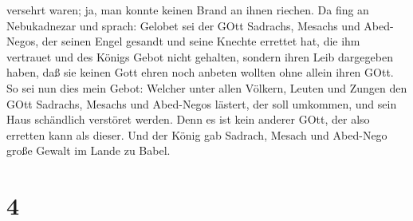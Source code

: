versehrt waren; ja, man konnte keinen Brand an ihnen riechen.
 Da fing an Nebukadnezar und sprach: Gelobet sei der GOtt
Sadrachs, Mesachs und Abed-Negos, der seinen Engel gesandt und seine
Knechte errettet hat, die ihm vertrauet und des Königs Gebot nicht
gehalten, sondern ihren Leib dargegeben haben, daß sie keinen Gott ehren
noch anbeten wollten ohne allein ihren GOtt.  So sei nun
dies mein Gebot: Welcher unter allen Völkern, Leuten und Zungen den GOtt
Sadrachs, Mesachs und Abed-Negos lästert, der soll umkommen, und sein
Haus schändlich verstöret werden. Denn es ist kein anderer GOtt, der
also erretten kann als dieser.  Und der König gab Sadrach,
Mesach und Abed-Nego große Gewalt im Lande zu Babel.

\hypertarget{section-3}{%
\section{4}\label{section-3}}

